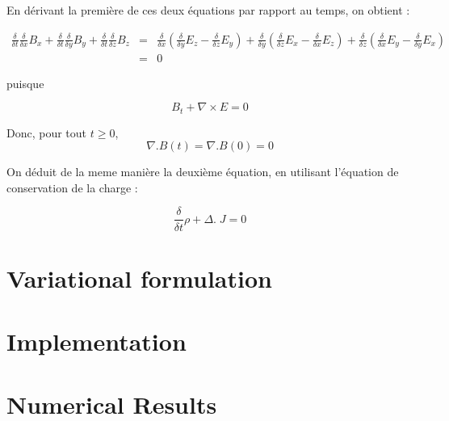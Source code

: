 En dérivant la première de ces deux équations par rapport au temps,
on obtient :

\begin{eqnarray*}
\frac{\delta}{\delta t}\frac{\delta}{\delta x}B_{x}+\frac{\delta}{\delta t}\frac{\delta}{\delta y}B_{y}+\frac{\delta}{\delta t}\frac{\delta}{\delta z}B_{z} & = & \frac{\delta}{\delta x}\left(\frac{\delta}{\delta y}E_{z}-\frac{\delta}{\delta z}E_{y}\right)+\frac{\delta}{\delta y}\left(\frac{\delta}{\delta z}E_{x}-\frac{\delta}{\delta x}E_{z}\right)+\frac{\delta}{\delta z}\left(\frac{\delta}{\delta x}E_{y}-\frac{\delta}{\delta y}E_{x}\right)\\
 & = & 0\end{eqnarray*}


puisque

\begin{equation}
  \label{eq:3}
  B_{t}+\nabla\times E=0
\end{equation}



Donc, pour tout $t\geq0$,
\begin{equation}
  \label{eq:4}
  \nabla.B(t)=\nabla.B(0)=0
\end{equation}

On déduit de la meme manière la deuxième équation, en utilisant l'équation de
conservation de la charge :

\begin{equation}
  \label{eq:2}
  \frac{\delta}{\delta t}\rho+\Delta.\; J=0
\end{equation}



\section{Variational formulation}
\label{sec:vari-form}

\section{Implementation}
\label{sec:implementation}

\section{Numerical Results}
\label{sec:numerical-results}



